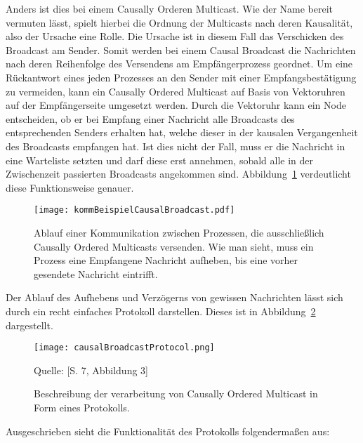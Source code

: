 Anders ist dies bei einem Causally Orderen Multicast. Wie der Name bereit vermuten lässt, spielt hierbei die Ordnung der Multicasts nach deren Kausalität, also der Ursache eine Rolle. Die Ursache ist in diesem Fall das Verschicken des Broadcast am Sender. Somit werden bei einem Causal Broadcast die Nachrichten nach deren Reihenfolge des Versendens am Empfängerprozess geordnet. Um eine Rückantwort eines jeden Prozesses an den Sender mit einer Empfangsbestätigung zu vermeiden, kann ein Causally Ordered Multicast auf Basis von Vektoruhren auf der Empfängerseite umgesetzt werden. Durch die Vektoruhr kann ein Node entscheiden, ob er bei Empfang einer Nachricht alle Broadcasts des entsprechenden Senders erhalten hat, welche dieser in der kausalen Vergangenheit des Broadcasts empfangen hat. Ist dies nicht der Fall, muss er die Nachricht in eine Warteliste setzten und darf diese erst annehmen, sobald alle in der Zwischenzeit passierten Broadcasts angekommen sind. Abbildung~\ref{figure:causalbroadcast} verdeutlicht diese Funktionsweise genauer.

\begin{figure}[ht]
	\centering
	\texttt{[image: kommBeispielCausalBroadcast.pdf]}
	\caption[Kommunikation durch Causally Ordered Multicasts]{Ablauf einer Kommunikation zwischen Prozessen, die ausschließlich Causally Ordered Multicasts versenden. Wie man sieht, muss ein Prozess eine Empfangene Nachricht aufheben, bis eine vorher gesendete Nachricht eintrifft.}
	\label{figure:causalbroadcast}
\end{figure}
\FloatBarrier

Der Ablauf des Aufhebens und Verzögerns von gewissen Nachrichten lässt sich durch ein recht einfaches Protokoll darstellen. Dieses ist in Abbildung~\ref{figure:causalBroadcastProtocol} dargestellt.

\begin{figure}[ht]
	\centering
	\texttt{[image: causalBroadcastProtocol.png]}
	\caption[Protokoll für den Causally Ordered Multicast]{Beschreibung der verarbeitung von Causally Ordered Multicast in Form eines Protokolls.}
	Quelle: \cite{Baldoni:2002:FDC:1435723.1437765}[S. 7, Abbildung 3]
	\label{figure:causalBroadcastProtocol}
\end{figure}
\FloatBarrier

Ausgeschrieben sieht die Funktionalität des Protokolls folgendermaßen aus:

